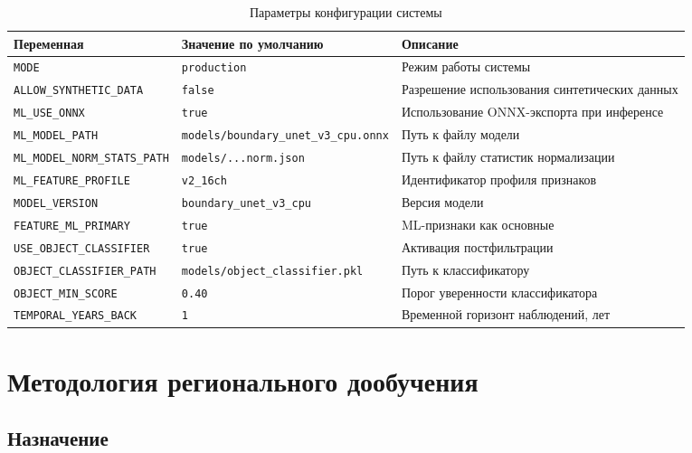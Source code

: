 \documentclass[14pt,a4paper]{extarticle}
\newcommand{\tbl}[1]{\texttt{#1}}  %
\newcommand{\env}[1]{\texttt{#1}}  %
\begin{document}
\begin{table}[h!]
\caption{Параметры конфигурации системы}
\label{tab:env}
\begin{tabularx}{\textwidth}{L{62mm}L{40mm}X}
\toprule
\textbf{Переменная} & \textbf{Значение по умолчанию} & \textbf{Описание} \\
\midrule
\env{MODE}                     & \tbl{production}    & Режим работы системы \\
\env{ALLOW\_SYNTHETIC\_DATA}   & \tbl{false}         & Разрешение использования синтетических данных \\
\env{ML\_USE\_ONNX}            & \tbl{true}          & Использование ONNX-экспорта при инференсе \\
\env{ML\_MODEL\_PATH}          & \tbl{models/boundary\_unet\_v3\_cpu.onnx} & Путь к файлу модели \\
\env{ML\_MODEL\_NORM\_STATS\_PATH} & \tbl{models/...norm.json} & Путь к файлу статистик нормализации \\
\env{ML\_FEATURE\_PROFILE}     & \tbl{v2\_16ch}      & Идентификатор профиля признаков \\
\env{MODEL\_VERSION}           & \tbl{boundary\_unet\_v3\_cpu} & Версия модели \\
\env{FEATURE\_ML\_PRIMARY}     & \tbl{true}          & ML-признаки как основные \\
\env{USE\_OBJECT\_CLASSIFIER}  & \tbl{true}          & Активация постфильтрации \\
\env{OBJECT\_CLASSIFIER\_PATH} & \tbl{models/object\_classifier.pkl} & Путь к классификатору \\
\env{OBJECT\_MIN\_SCORE}       & \tbl{0.40}          & Порог уверенности классификатора \\
\env{TEMPORAL\_YEARS\_BACK}    & \tbl{1}             & Временной горизонт наблюдений, лет \\
\bottomrule
\end{tabularx}
\end{table}

\section{Методология регионального дообучения}

\subsection{Назначение}
\end{document}
